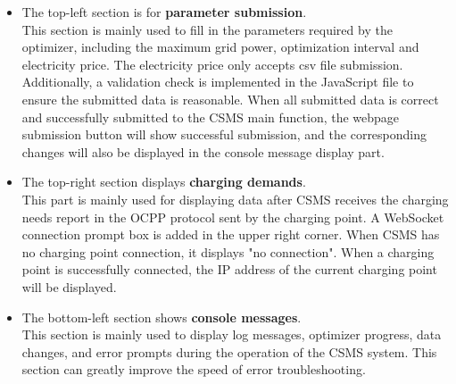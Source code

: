 \documentclass[
	english,
	ruledheaders=section,%
	class=report,%
	thesis={type=Report},%
	accentcolor=9c,%
	custommargins=true,%
	marginpar=false,%
	parskip=half-,%
	fontsize=11pt,%
	logofile={img/tuda_logo.pdf}, %
]{tudapub}
\begin{document}
\begin{itemize}
    \item The top-left section is for \textbf{parameter submission}.\\  
    This section is mainly used to fill in the parameters required by the optimizer, including the maximum grid power, optimization interval and electricity price. The electricity price only accepts csv file submission. Additionally, a validation check is implemented in the JavaScript file to ensure the submitted data is reasonable. When all submitted data is correct and successfully submitted to the \ac{CSMS} main function, the webpage submission button will show successful submission, and the corresponding changes will also be displayed in the console message display part.
    \item The top-right section displays \textbf{charging demands}.\\
    This part is mainly used for displaying data after \ac{CSMS} receives the charging needs report in the \ac{OCPP} protocol sent by the charging point. A WebSocket connection prompt box is added in the upper right corner. When \ac{CSMS} has no charging point connection, it displays "no connection". When a charging point is successfully connected, the IP address of the current charging point will be displayed.

    \item The bottom-left section shows \textbf{console messages}.\\
    This section is mainly used to display log messages, optimizer progress, data changes, and error prompts during the operation of the \ac{CSMS} system. This section can greatly improve the speed of error troubleshooting.
    

\end{itemize}
\end{document}
